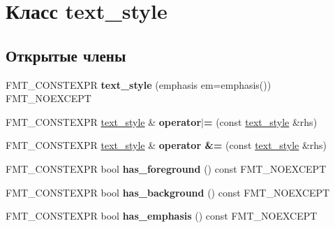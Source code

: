 \hypertarget{classtext__style}{}\section{Класс text\+\_\+style}
\label{classtext__style}
\subsection*{Открытые члены}
\begin{DoxyCompactItemize}
\item 
\mbox{\label{classtext__style_a67f289d8275892ad458966e9d44cd246}} 
F\+M\+T\+\_\+\+C\+O\+N\+S\+T\+E\+X\+PR {\bfseries text\+\_\+style} (emphasis em=emphasis()) F\+M\+T\+\_\+\+N\+O\+E\+X\+C\+E\+PT
\item 
\mbox{\label{classtext__style_aaa488412bf58f9a9760b421dea9aeaa9}} 
F\+M\+T\+\_\+\+C\+O\+N\+S\+T\+E\+X\+PR \hyperlink{classtext__style}{text\+\_\+style} \& {\bfseries operator$\vert$=} (const \hyperlink{classtext__style}{text\+\_\+style} \&rhs)
\item 
\mbox{\label{classtext__style_a347bf58ff73936da8f35bbb4f595975b}} 
F\+M\+T\+\_\+\+C\+O\+N\+S\+T\+E\+X\+PR \hyperlink{classtext__style}{text\+\_\+style} \& {\bfseries operator \&=} (const \hyperlink{classtext__style}{text\+\_\+style} \&rhs)
\item 
\mbox{\label{classtext__style_ad605ce62796a99d87f0e9744617cf402}} 
F\+M\+T\+\_\+\+C\+O\+N\+S\+T\+E\+X\+PR bool {\bfseries has\+\_\+foreground} () const F\+M\+T\+\_\+\+N\+O\+E\+X\+C\+E\+PT
\item 
\mbox{\label{classtext__style_afa9f90cd308a4a4b61ab8f6d6178a581}} 
F\+M\+T\+\_\+\+C\+O\+N\+S\+T\+E\+X\+PR bool {\bfseries has\+\_\+background} () const F\+M\+T\+\_\+\+N\+O\+E\+X\+C\+E\+PT
\item 
\mbox{\label{classtext__style_a57443deabb81d0e013d81813fc4d55cb}} 
F\+M\+T\+\_\+\+C\+O\+N\+S\+T\+E\+X\+PR bool {\bfseries has\+\_\+emphasis} () const F\+M\+T\+\_\+\+N\+O\+E\+X\+C\+E\+PT
\item 
\mbox{\label{classtext__style_a695368429b582c3fef9b28e138beec4a}} 

\end{DoxyCompactItemize}
